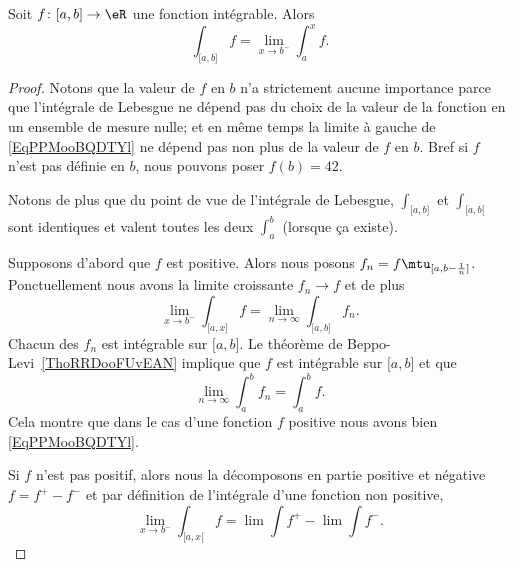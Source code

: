 \begin{proposition}     \label{PropCJAooQhNYkp}
    Soit \( f\colon \mathopen[ a , b \mathclose]\to \eR\) une fonction intégrable. Alors
    \begin{equation}    \label{EqPPMooBQDTYl}
        \int_{\mathopen[ a , b \mathclose]}f=\lim_{x\to b^-} \int_a^xf.
    \end{equation}
\end{proposition}

\begin{proof}
    Notons que la valeur de \( f\) en \( b\) n'a strictement aucune importance parce que l'intégrale de Lebesgue ne dépend pas du choix de la valeur de la fonction en un ensemble de mesure nulle; et en même temps la limite à gauche de \eqref{EqPPMooBQDTYl} ne dépend pas non plus de la valeur de \( f\) en \( b\). Bref si \( f\) n'est pas définie en \( b\), nous pouvons poser \( f(b)=42\).

    Notons de plus que du point de vue de l'intégrale de Lebesgue, \( \int_{\mathopen[ a , b \mathclose]}\) et \( \int_{\mathopen[ a , b [}\) sont identiques et valent toutes les deux \( \int_a^b\) (lorsque ça existe).

    Supposons d'abord que \( f\) est positive. Alors nous posons \( f_n=f\mtu_{\mathopen[ a , b-\frac{1}{ n } \mathclose]}\). Ponctuellement nous avons la limite croissante \( f_n\to f\) et de plus
    \begin{equation}
        \lim_{x\to b^-} \int_{\mathopen[ a , x \mathclose]}f=\lim_{n\to \infty} \int_{\mathopen[ a , b \mathclose]}f_n.
    \end{equation}
    Chacun des \( f_n\) est intégrable sur \( \mathopen[ a , b \mathclose]\). Le théorème de Beppo-Levi~\ref{ThoRRDooFUvEAN} implique que \( f\) est intégrable sur \( \mathopen[ a , b \mathclose]\) et que
    \begin{equation}
        \lim_{n\to \infty} \int_a^bf_n=\int_a^bf.
    \end{equation}
    Cela montre que dans le cas d'une fonction \( f\) positive nous avons bien \eqref{EqPPMooBQDTYl}.

    Si \( f\) n'est pas positif, alors nous la décomposons en partie positive et négative \( f=f^+-f^{-}\) et par définition de l'intégrale d'une fonction non positive,
    \begin{equation}
        \lim_{x\to b^-} \int_{\mathopen[ a , x [}f=\lim\int f^{+}-\lim\int f^-.
    \end{equation}
\end{proof}


